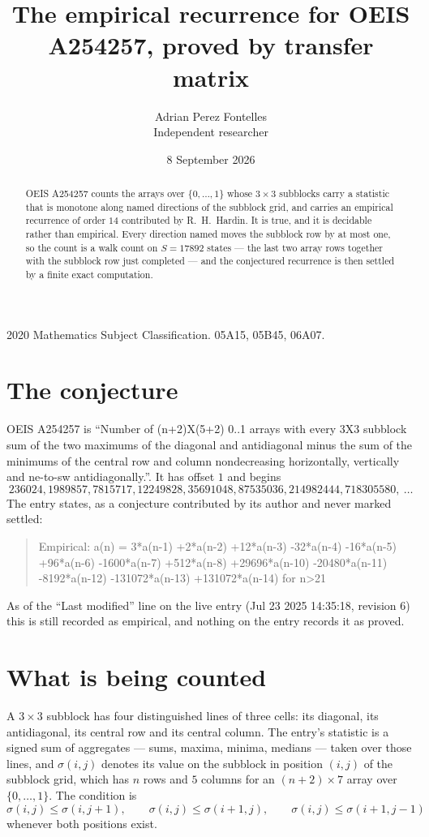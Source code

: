 \documentclass[11pt,a4paper]{article}
\title{The empirical recurrence for OEIS A254257, proved by transfer matrix}
\author{Adrian Perez Fontelles\\ \small Independent researcher}
\date{8 September 2026}
\theoremstyle{plain}
\theoremstyle{definition}
\begin{document}
\maketitle

\begin{abstract}
OEIS A254257 counts the arrays over $\{0,\dots,1\}$ whose $3\times3$ subblocks carry a
statistic that is monotone along named directions of the subblock grid, and carries an
empirical recurrence of order $14$ contributed by R.~H.~Hardin. It is true, and it is
decidable rather than empirical. Every direction named moves the subblock row by at most one,
so the count is a walk count on $S=17892$ states --- the last two array rows together with the
subblock row just completed --- and the conjectured recurrence is then settled by a finite
exact computation.
\end{abstract}

\noindent\small 2020 Mathematics Subject Classification. 05A15, 05B45, 06A07.\normalsize

\section{The conjecture}

OEIS A254257 is ``Number of (n+2)X(5+2) 0..1 arrays with every 3X3 subblock sum of the two maximums of the diagonal and antidiagonal minus the sum of the minimums of the central row and column nondecreasing horizontally, vertically and ne-to-sw antidiagonally.''. It has offset $1$ and begins
\[
236024, 1989857, 7815717, 12249828, 35691048, 87535036, 214982444, 718305580,\ \dots
\]
The entry states, as a conjecture contributed by its author and never marked settled:
\begin{quote}
Empirical: a(n) = 3*a(n-1) +2*a(n-2) +12*a(n-3) -32*a(n-4) -16*a(n-5) +96*a(n-6) -1600*a(n-7) +512*a(n-8) +29696*a(n-10) -20480*a(n-11) -8192*a(n-12) -131072*a(n-13) +131072*a(n-14) for n>21
\end{quote}
As of the ``Last modified'' line on the live entry (Jul 23 2025 14:35:18, revision 6) this is still
recorded as empirical, and nothing on the entry records it as proved.

\section{What is being counted}

A $3\times3$ subblock has four distinguished lines of three cells: its diagonal, its
antidiagonal, its central row and its central column. The entry's statistic is a signed sum of
aggregates --- sums, maxima, minima, medians --- taken over those lines, and $\sigma(i,j)$
denotes its value on the subblock in position $(i,j)$ of the subblock grid, which has $n$ rows
and $5$ columns for an $(n+2)\times7$ array over $\{0,\dots,1\}$. The condition is
\[
\sigma(i,j)\le\sigma(i,j+1),\qquad \sigma(i,j)\le\sigma(i+1,j),\qquad \sigma(i,j)\le\sigma(i+1,j-1)
\]
whenever both positions exist.
\end{document}
